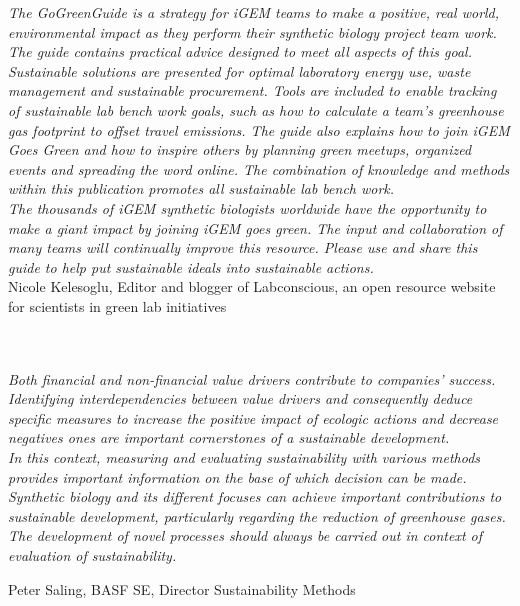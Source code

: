 \thispagestyle{empty}

\vspace*{\fill}

\noindent \textit{The GoGreenGuide is a strategy for iGEM teams to make a positive, real world, environmental impact as they perform their synthetic biology project team work. The guide contains practical advice designed to meet all aspects of this goal. Sustainable solutions are presented for optimal laboratory energy use, waste management and sustainable procurement. Tools are included to enable tracking of sustainable lab bench work goals, such as how to calculate a team's greenhouse gas footprint to offset travel emissions. The guide also explains how to join iGEM Goes Green and how to inspire others by planning green meetups, organized events and spreading the word online. The combination of knowledge and methods within this publication promotes all sustainable lab bench work.} \\

\noindent \textit{The thousands of iGEM synthetic biologists worldwide have the opportunity to make a giant impact by joining iGEM goes green. The input and collaboration of many teams will continually improve this resource. Please use and share this guide to help put sustainable ideals into sustainable actions.} \\

Nicole Kelesoglu, Editor and blogger of Labconscious, an open resource website for scientists in green lab initiatives \\\bigskip
 \\\bigskip
 \\\bigskip

\noindent \textit{Both financial and non-financial value drivers contribute to companies' success. Identifying interdependencies between value drivers and consequently deduce specific measures to increase the positive impact of ecologic actions and decrease negatives ones are important cornerstones of a sustainable development.} \\
	
	
\noindent \textit{In this context, measuring and evaluating sustainability with various methods provides important information on the base of which decision can be made.} \\


\noindent \textit{Synthetic biology and its different focuses can achieve important contributions to sustainable development, particularly regarding the reduction of greenhouse gases. The development of novel processes should always be carried out in context of evaluation of sustainability.} \\\bigskip


Peter Saling, BASF SE, Director Sustainability Methods


\vspace*{\fill}